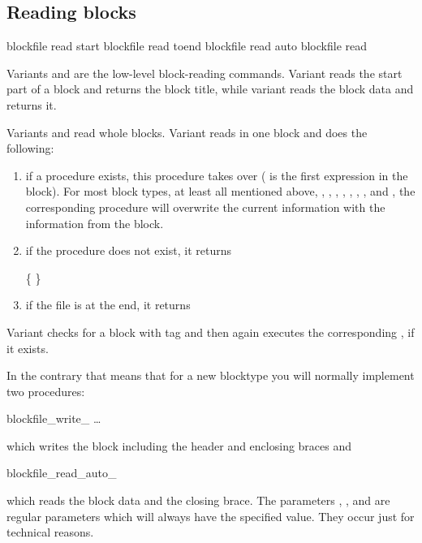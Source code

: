 \subsection{Reading blocks}

\begin{essyntax}
   blockfile  read start 
   blockfile  read toend 
   blockfile  read auto 
   blockfile  read 
\end{essyntax}

Variants  and  are the low-level block-reading
commands. Variant  reads the start part of a block and
returns the block title, while variant  reads the block
data and returns it.

Variants  and  read whole blocks.
Variant  reads in one block and does the following:
\begin{enumerate}
\item if a procedure  exists,
  this procedure takes over ( is the first expression in the
  block). For most block types, at least all mentioned above, \ie
  , , ,
  , , ,
  , and , the corresponding
  procedure will overwrite the current information with the
  information from the block.
\item if the procedure does not exist, it returns 
  \begin{code}
    \{   \}
  \end{code}
\item if the file is at the end, it returns 
\end{enumerate}

Variant  checks for a block with tag  and then
again executes the corresponding ,
if it exists.

In the contrary that means that for a new blocktype you will normally
implement two procedures:
\begin{essyntaxbox}
  blockfile_write_    \dots
\end{essyntaxbox}
which writes the block including the header and enclosing braces and
\begin{essyntaxbox}
  blockfile_read_auto_   
\end{essyntaxbox}
which reads the block data and the closing brace. The parameters
, ,  and  are regular
parameters which will always have the specified value. They occur just
for technical reasons.

